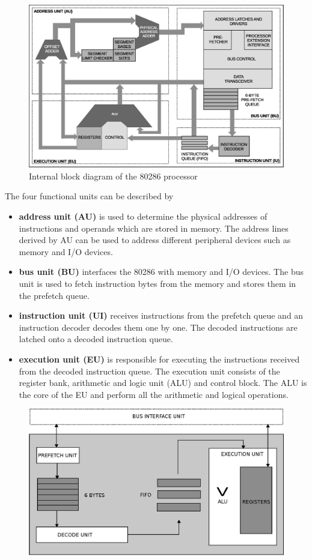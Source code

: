 \documentclass[book.tex]{subfiles}
\begin{document}
\begin{figure}[H]
\centering
\includegraphics[width=\textwidth]{imgs/drawings/286_architecture.eps}
\caption{Internal block diagram of the 80286 processor}
\end{figure}
\par
The four functional units can be described by
\begin{itemize}
\item \textbf{address unit (AU)} is used to determine the physical addresses of instructions and operands which are stored in memory. The address lines derived by AU can be used to address different peripheral devices such as memory and I/O devices. 
\item \textbf{bus unit (BU)} interfaces the 80286 with memory and I/O devices. The bus unit is used to fetch instruction bytes from the memory and stores them in the prefetch queue.
\item \textbf{instruction unit (UI)} receives instructions from the prefetch queue and an instruction decoder decodes them one by one. The decoded instructions are latched onto a decoded instruction queue.
\item \textbf{execution unit (EU)} is responsible for executing the instructions received from the decoded instruction queue. The execution unit consists of the register bank, arithmetic and logic unit (ALU) and control block. The ALU is the core of the EU and perform all the arithmetic and logical operations.
\end{itemize}
\par
\begin{figure}[H] 
\centering
\includegraphics[width=\textwidth]{imgs/drawings/processing_unit.eps}
\end{figure}
\end{document}
